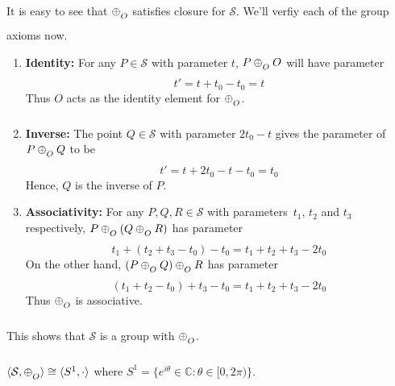 It is easy to see that $\conop$ satisfies closure for $\mathcal{S}$. We'll verfiy each of 
the group axioms now.

\begin{enumerate}
    \item{\textbf{Identity:}} For any $P \in \mathcal{S}$ with parameter $t$,
        $P \conop O$ will have parameter
        \[ t' = t + t_0 - t_0 = t \]
        Thus $O$ acts as the identity element for $\conop$.

    \item{\textbf{Inverse:}} The point $Q\in\mathcal{S}$ with parameter
        $2t_0 - t$ gives the parameter of $P \conop Q$ to be
        \[ t' = t + 2t_0 - t - t_0 = t_0 \]
        Hence, $Q$ is the inverse of $P$.

    \item{\textbf{Associativity:}} For any $P,Q,R \in \mathcal{S}$ with parameters\
        $t_1$, $t_2$ and $t_3$ respectively, $P\conop(Q \conop R)$
        has parameter
        \[
            t_1 + (t_2 + t_3 - t_0) - t_0 =
            t_1 + t_2 + t_3 - 2t_0
        \]
        On the other hand, $(P \conop Q)\conop R$ has parameter
        \[
            (t_1 + t_2 - t_0) + t_3 - t_0 =
            t_1 + t_2 + t_3 - 2t_0
        \]
        Thus $\conop$ is associative.
\end{enumerate}

\noindent
This shows that $\mathcal{S}$ is a group with $\conop$.

\begin{theorem}
    $\langle \mathcal{S},\conop \rangle \cong \langle S^1,\cdot \rangle$ where
    $S^1=\{e^{i\theta}\in\mathbb{C}: \theta \in [0,2\pi)\}$.
\end{theorem}

